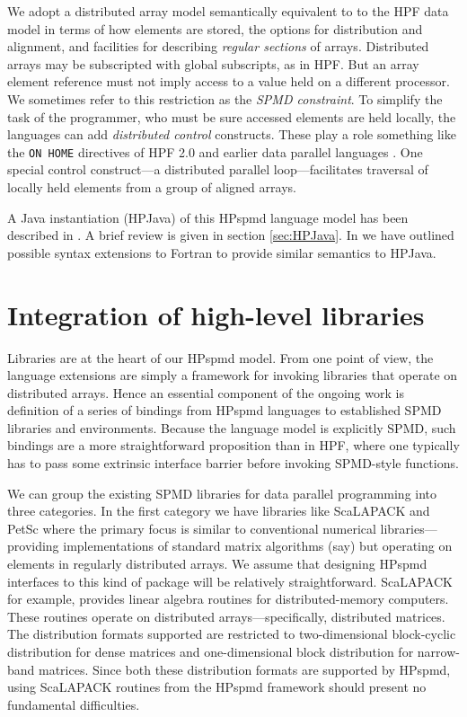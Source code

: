 We adopt a distributed array model
semantically equivalent to to the HPF data model in terms of how
elements are stored, the options for distribution and alignment, and
facilities for describing {\em regular sections} of arrays.
Distributed arrays may be subscripted with global subscripts, as in
HPF.  But an array element reference must not imply access to a
value held on a different processor.  We sometimes refer to this
restriction as the {\em SPMD constraint}.  To simplify the task of the
programmer, who must be sure accessed elements are held locally, the
languages can add {\em distributed control} constructs.
These play a role something like the {\tt ON HOME} directives of HPF
2.0 and earlier data parallel languages \cite{Kali}.  One special
control construct---a distributed parallel loop---facilitates traversal
of locally held elements from a group of aligned arrays.

A Java instantiation (HPJava) of this HPspmd language model
has been described in \cite{HPJava}.  A brief review is
given in section \ref{sec:HPJava}.  
In \cite{Bindings} we have outlined possible syntax
extensions to Fortran to provide similar semantics to HPJava. 

\section{Integration of high-level libraries\label{libraries}}

Libraries are at the heart of our HPspmd model.  From one point of
view, the language extensions are simply a framework for invoking
libraries that operate on distributed arrays.  
Hence an essential component of the ongoing work is definition of a series of
bindings from HPspmd languages to established SPMD libraries and
environments.  Because the language model is explicitly SPMD, such
bindings are a more straightforward proposition than in HPF, where
one typically has to pass some extrinsic interface barrier before
invoking SPMD-style functions.

We can group the existing SPMD libraries for data parallel programming
into three categories.
In the first category we have libraries like ScaLAPACK \cite{ScaLAPACK}
and PetSc \cite{PETSc1} where the primary focus is similar to
conventional numerical libraries---providing implementations of
standard matrix algorithms (say) but operating on elements in regularly
distributed arrays.  We assume that designing HPspmd interfaces to
this kind of package will be relatively straightforward.
ScaLAPACK for example, provides linear algebra routines for
distributed-memory computers.  These routines operate on distributed
arrays---specifically, distributed matrices.  The distribution formats
supported are restricted to two-dimensional block-cyclic distribution
for dense matrices and one-dimensional block distribution for
narrow-band matrices.  Since both these distribution formats are
supported by HPspmd, using ScaLAPACK routines from the HPspmd framework should
present no fundamental difficulties.


